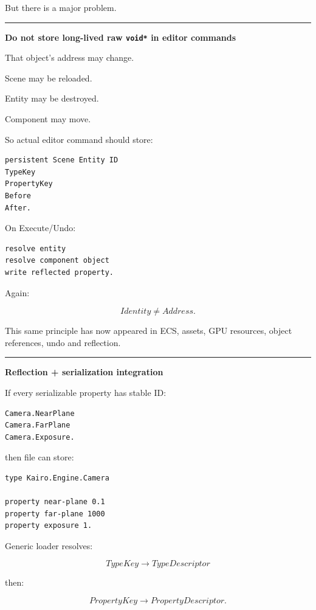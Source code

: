 But there is a major problem.

\begin{center}\rule{0.5\linewidth}{0.5pt}\end{center}

\textbf{Do not store long-lived raw \texttt{void*} in editor commands}

That object's address may change.

Scene may be reloaded.

Entity may be destroyed.

Component may move.

So actual editor command should store:

\begin{verbatim}
persistent Scene Entity ID
TypeKey
PropertyKey
Before
After.
\end{verbatim}

On Execute/Undo:

\begin{verbatim}
resolve entity
resolve component object
write reflected property.
\end{verbatim}

Again:

\[
\boxed{
Identity
\neq
Address.
}
\]

This same principle has now appeared in ECS, assets, GPU resources, object references, undo and reflection.

\begin{center}\rule{0.5\linewidth}{0.5pt}\end{center}

\textbf{Reflection + serialization integration}

If every serializable property has stable ID:

\begin{verbatim}
Camera.NearPlane
Camera.FarPlane
Camera.Exposure.
\end{verbatim}

then file can store:

\begin{verbatim}
type Kairo.Engine.Camera

property near-plane 0.1
property far-plane 1000
property exposure 1.
\end{verbatim}

Generic loader resolves:

\[
TypeKey
\rightarrow
TypeDescriptor
\]

then:

\[
PropertyKey
\rightarrow
PropertyDescriptor.
\]

